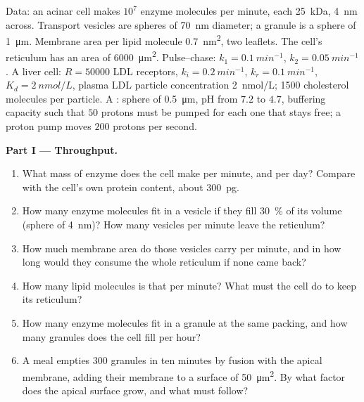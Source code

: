 \begin{problem}
\label{pb:b3:membrane-traffic:1}
Data: an acinar cell makes $10^{7}$ enzyme molecules per minute, each
\qty{25}{kDa}, \qty{4}{nm} across. Transport vesicles are spheres of
\qty{70}{nm} diameter; a granule is a sphere of \qty{1}{\micro m}.
Membrane area per lipid molecule \qty{0.7}{nm^2}, two leaflets. The
cell's reticulum has an area of \qty{6000}{\micro m^2}. Pulse--chase:
$k_{1} = \qty{0.1}{min^{-1}}$, $k_{2} = \qty{0.05}{min^{-1}}$. A liver
cell: $R = \num{50000}$ LDL receptors, $k_{i} = \qty{0.2}{min^{-1}}$,
$k_{r} = \qty{0.1}{min^{-1}}$, $K_{d} = \qty{2}{nmol/L}$, plasma LDL
particle concentration \qty{2}{nmol/L}; \num{1500} cholesterol molecules
per particle.
A : sphere of \qty{0.5}{\micro m}, pH from $7.2$ to $4.7$,
buffering capacity such that $50$ protons must be pumped for each one
that stays free; a proton pump moves $200$ protons per second.

\medskip
\noindent\textbf{Part I --- Throughput.}
\begin{enumerate}
  \item What mass of enzyme does the cell make per minute, and per day?
        Compare with the cell's own protein content, about
        \qty{300}{pg}.
  \item How many enzyme molecules fit in a vesicle if they fill
        \qty{30}{\%} of its volume (sphere of \qty{4}{nm})? How many
        vesicles per minute leave the reticulum?
  \item How much membrane area do those vesicles carry per minute, and
        in how long would they consume the whole reticulum if none came
        back?
  \item How many lipid molecules is that per minute? What must the
        cell do to keep its reticulum?
  \item How many enzyme molecules fit in a granule at the same packing,
        and how many granules does the cell fill per hour?
  \item A meal empties $300$ granules in ten minutes by fusion with
        the apical membrane, adding their membrane to a surface of
        \qty{50}{\micro m^2}. By what factor does the apical surface
        grow, and what must follow?
\end{enumerate}


\end{problem}
